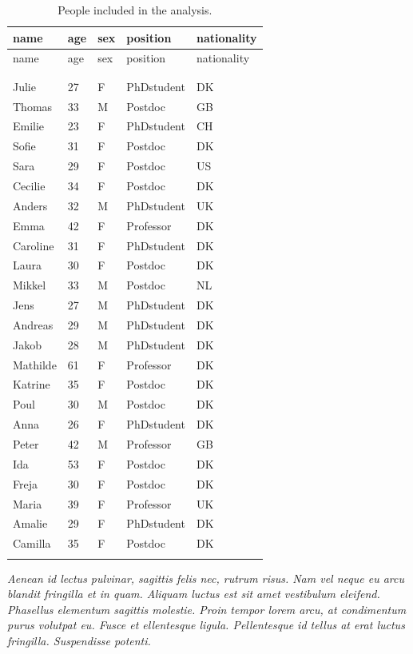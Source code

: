 \documentclass[
  a4paper,
]{scrbook}
\let\oldemph\emph
\renewcommand\emph[1]{\oldemph{\color{gray}#1}}
\begin{document}
\begin{longtable}[]{@{}lllll@{}}

\toprule\noalign{}
name & age & sex & position & nationality \\
\midrule\noalign{}
\endfirsthead
\toprule\noalign{}
name & age & sex & position & nationality \\
\midrule\noalign{}
\endhead
\bottomrule\noalign{}
\tabularnewline
\caption{}\label{T_8db8e}\tabularnewline
\endlastfoot
Julie & 27 & F & PhDstudent & DK \\
Thomas & 33 & M & Postdoc & GB \\
Emilie & 23 & F & PhDstudent & CH \\
Sofie & 31 & F & Postdoc & DK \\
Sara & 29 & F & Postdoc & US \\
Cecilie & 34 & F & Postdoc & DK \\
Anders & 32 & M & PhDstudent & UK \\
Emma & 42 & F & Professor & DK \\
Caroline & 31 & F & PhDstudent & DK \\
Laura & 30 & F & Postdoc & DK \\
Mikkel & 33 & M & Postdoc & NL \\
Jens & 27 & M & PhDstudent & DK \\
Andreas & 29 & M & PhDstudent & DK \\
Jakob & 28 & M & PhDstudent & DK \\
Mathilde & 61 & F & Professor & DK \\
Katrine & 35 & F & Postdoc & DK \\
Poul & 30 & M & Postdoc & DK \\
Anna & 26 & F & PhDstudent & DK \\
Peter & 42 & M & Professor & GB \\
Ida & 53 & F & Postdoc & DK \\
Freja & 30 & F & Postdoc & DK \\
Maria & 39 & F & Professor & UK \\
Amalie & 29 & F & PhDstudent & DK \\
Camilla & 35 & F & Postdoc & DK \\


\caption{\label{tbl-subjects}People included in the analysis.}

\tabularnewline
\end{longtable}

\emph{Aenean id lectus pulvinar, sagittis felis nec, rutrum risus. Nam
vel neque eu arcu blandit fringilla et in quam. Aliquam luctus est sit
amet vestibulum eleifend. Phasellus elementum sagittis molestie. Proin
tempor lorem arcu, at condimentum purus volutpat eu. Fusce et
ellentesque ligula. Pellentesque id tellus at erat luctus fringilla.
Suspendisse potenti.}
\end{document}
